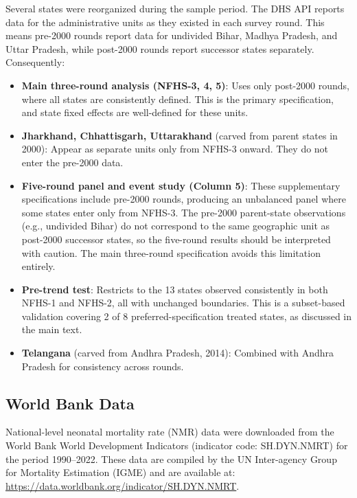 \documentclass[12pt]{article}
\begin{document}
Several states were reorganized during the sample period. The DHS API reports data for the administrative units as they existed in each survey round. This means pre-2000 rounds report data for undivided Bihar, Madhya Pradesh, and Uttar Pradesh, while post-2000 rounds report successor states separately. Consequently:
\begin{itemize}
    \item \textbf{Main three-round analysis (NFHS-3, 4, 5)}: Uses only post-2000 rounds, where all states are consistently defined. This is the primary specification, and state fixed effects are well-defined for these units.
    \item \textbf{Jharkhand, Chhattisgarh, Uttarakhand} (carved from parent states in 2000): Appear as separate units only from NFHS-3 onward. They do not enter the pre-2000 data.
    \item \textbf{Five-round panel and event study (Column 5)}: These supplementary specifications include pre-2000 rounds, producing an unbalanced panel where some states enter only from NFHS-3. The pre-2000 parent-state observations (e.g., undivided Bihar) do not correspond to the same geographic unit as post-2000 successor states, so the five-round results should be interpreted with caution. The main three-round specification avoids this limitation entirely.
    \item \textbf{Pre-trend test}: Restricts to the 13 states observed consistently in both NFHS-1 and NFHS-2, all with unchanged boundaries. This is a subset-based validation covering 2 of 8 preferred-specification treated states, as discussed in the main text.
    \item \textbf{Telangana} (carved from Andhra Pradesh, 2014): Combined with Andhra Pradesh for consistency across rounds.
\end{itemize}

\subsection{World Bank Data}

National-level neonatal mortality rate (NMR) data were downloaded from the World Bank World Development Indicators (indicator code: SH.DYN.NMRT) for the period 1990--2022. These data are compiled by the UN Inter-agency Group for Mortality Estimation (IGME) and are available at: \url{https://data.worldbank.org/indicator/SH.DYN.NMRT}.


\end{document}
